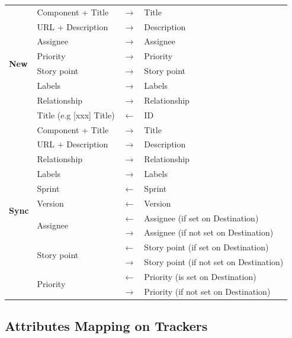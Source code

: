 \begin{longtable}{|l|l|l|l|}
   \multirow{8}{*}{\textbf{New}}
      & Component + Title & $\rightarrow$ & Title \\
      \cline{2-4}
      & URL + Description & $\rightarrow$ & Description \\
      \cline{2-4}
      & Assignee & $\rightarrow$ & Assignee \\
      \cline{2-4}
      & Priority & $\rightarrow$ & Priority \\
      \cline{2-4}
      & Story point & $\rightarrow$ & Story point \\
      \cline{2-4}
      & Labels & $\rightarrow$ & Labels \\
      \cline{2-4}
      & Relationship & $\rightarrow$ & Relationship \\
      \cline{2-4}
      & Title (e.g [xxx] Title) & $\leftarrow$ & ID \\
   \hline
   \multirow{12}{*}{\textbf{Sync}}
      & Component + Title & $\rightarrow$ & Title \\
      \cline{2-4}
      & URL + Description & $\rightarrow$ & Description \\
      \cline{2-4}
      & Relationship & $\rightarrow$ & Relationship \\
      \cline{2-4}
      & Labels & $\rightarrow$ & Labels \\
      \cline{2-4}
      & Sprint & $\leftarrow$ & Sprint \\
      \cline{2-4}
      & Version & $\leftarrow$ & Version \\
      \cline{2-4}
      & \multirow{2}{*}{Assignee}
         & $\leftarrow$ & Assignee (if set on Destination) \\
         \cline{3-4}
         & & $\rightarrow$ & Assignee (if not set on Destination) \\
      \cline{2-4}
      & \multirow{2}{*}{Story point}
         & $\leftarrow$ & Story point (if set on Destination) \\
         \cline{3-4}
         & & $\rightarrow$ & Story point (if not set on Destination) \\
      \cline{2-4}
      & \multirow{2}{*}{Priority}
         & $\leftarrow$ & Priority (is set on Destination) \\
         \cline{3-4}
         & & $\rightarrow$ & Priority (if not set on Destination) \\
   \hline
\end{longtable}


\subsection{Attributes Mapping on Trackers}

